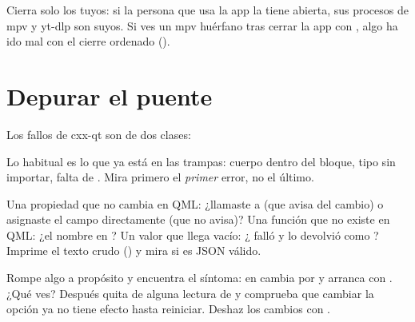 Cierra solo los tuyos: si la persona que usa la app la tiene abierta, sus procesos de mpv y
yt-dlp son suyos. Si ves un mpv huérfano tras cerrar la app con , algo ha ido mal con
el cierre ordenado ().

\section{Depurar el puente}

Los fallos de cxx-qt son de dos clases:

\begin{description}[style=nextline, leftmargin=0pt]
  \item[Al compilar] Lo habitual es lo que ya está en las trampas: cuerpo dentro del bloque,
  tipo sin importar, falta de . Mira primero el \emph{primer}
  error, no el último.
  \item[En ejecución] Una propiedad que no cambia en QML: ¿llamaste a  (que avisa
  del cambio) o asignaste el campo directamente (que no avisa)? Una función que no existe en
  QML: ¿el nombre en ? Un valor que llega vacío: ¿ falló y
   lo devolvió como \cod{[]}? Imprime el texto crudo
  () y mira si es JSON válido.
\end{description}

\begin{ejercicio}
Rompe algo a propósito y encuentra el síntoma: en  cambia
 por  y arranca con .
¿Qué ves? Después quita  de alguna lectura de 
y comprueba que cambiar la opción ya no tiene efecto hasta reiniciar. Deshaz los cambios con
.
\end{ejercicio}
